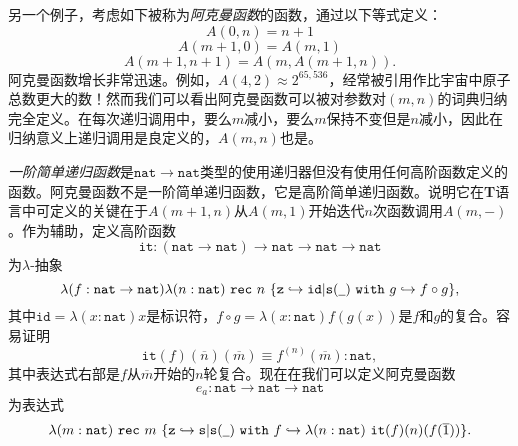 另一个例子，考虑如下被称为\textit{阿克曼函数}的函数，通过以下等式定义：
\begin{equation*}
A(0,n)=n+1
\end{equation*}
\begin{equation*}
A(m+1,0)=A(m,1)
\end{equation*}
\begin{equation*}
A(m+1,n+1)=A(m,A(m+1,n)).
\end{equation*}
阿克曼函数增长非常迅速。例如，$A(4,2)\approx2^{65,536}$，经常被引用作比宇宙中原子总数更大的数！然而我们可以看出阿克曼函数可以被对参数对$(m,n)$的词典归纳完全定义。在每次递归调用中，要么$m$减小，要么$m$保持不变但是$n$减小，因此在归纳意义上递归调用是良定义的，$A(m,n)$也是。

\textit{一阶简单递归函数}是$\mathtt{nat}\to\mathtt{nat}$类型的使用递归器但没有使用任何高阶函数定义的函数。阿克曼函数不是一阶简单递归函数，它是高阶简单递归函数。说明它在\textbf{T}语言中可定义的关键在于$A(m+1,n)$从$A(m,1)$开始迭代$n$次函数调用$A(m,-)$。作为辅助，定义高阶函数
\begin{equation*}
\mathtt{it}:(\mathtt{nat}\to\mathtt{nat})\to\mathtt{nat}\to\mathtt{nat}\to\mathtt{nat}
\end{equation*}
为$\lambda$-抽象
\begin{equation*}
\lambda(f:\mathtt{nat}\to\mathtt{nat})\lambda(n:\mathtt{nat})\ \mathtt{rec}\ n\ \{\mathtt{z}\hookrightarrow\mathtt{id}|\mathtt{s}(\underline{\hspace{0.5em}})\ \mathtt{with}\ g\hookrightarrow f\circ g\},
\end{equation*}
其中$\mathtt{id}=\lambda(x:\mathtt{nat})x$是标识符，$f\circ g=\lambda(x:\mathtt{nat})f(g(x))$是$f$和$g$的复合。容易证明
\begin{equation*}
\mathtt{it}(f)(\overline{n})(\overline{m})\equiv f^{(n)}(\overline{m}):\mathtt{nat},
\end{equation*}
其中表达式右部是$f$从$\overline{m}$开始的$n$轮复合。现在在我们可以定义阿克曼函数
\begin{equation*}
e_a:\mathtt{nat}\to\mathtt{nat}\to\mathtt{nat}
\end{equation*}
为表达式
\begin{equation*}
\lambda(m:\mathtt{nat})\ \mathtt{rec}\ m\ \{\mathtt{z}\hookrightarrow\mathtt{s}|\mathtt{s}(\underline{\hspace{0.5em}})\ \mathtt{with}\ f\hookrightarrow\lambda(n:\mathtt{nat})\ \mathtt{it}(f)(n)(f(\overline{1}))\}.
\end{equation*}

